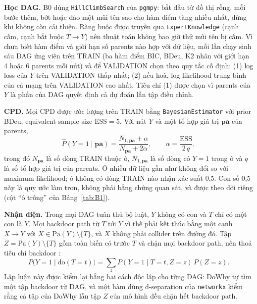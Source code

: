 \documentclass[pdflatex,sn-mathphys-num]{sn-jnl}%
\newcommand{\doop}{\mathrm{do}}                   %
\newcommand{\PaY}{\mathrm{Pa}(Y)}                 %
\begin{document}
\textbf{Học DAG.} B0 dùng \texttt{HillClimbSearch} của \texttt{pgmpy}: bắt đầu từ đồ thị rỗng, mỗi bước thêm, bớt hoặc đảo một mũi tên sao cho hàm điểm tăng nhiều nhất, dừng khi không còn cải thiện. Ràng buộc được truyền qua \texttt{ExpertKnowledge} (cạnh cấm, cạnh bắt buộc $T \to Y$) nên thuật toán không bao giờ thử mũi tên bị cấm. Vì chưa biết hàm điểm và giới hạn số parents nào hợp với dữ liệu, mỗi lần chạy sinh sáu DAG ứng viên trên TRAIN (ba hàm điểm BIC, BDeu, K2 nhân với giới hạn 4 hoặc 6 parents mỗi nút) và để VALIDATION chọn theo quy tắc cố định: (1) log loss của $Y$ trên VALIDATION thấp nhất; (2) nếu hoà, log-likelihood trung bình của cả mạng trên VALIDATION cao nhất. Tiêu chí (1) được chọn vì parents của $Y$ là phần của DAG quyết định cả dự đoán lẫn tập điều chỉnh.

\textbf{CPD.} Mọi CPD được ước lượng trên TRAIN bằng \texttt{BayesianEstimator} với prior BDeu, equivalent sample size $\mathrm{ESS}=5$. Với nút $Y$ và một tổ hợp giá trị $\mathbf{pa}$ của parents,
\begin{equation}\label{eq:bdeu}
\hat{P}(Y{=}1 \mid \mathbf{pa}) = \frac{N_{1,\mathbf{pa}} + \alpha}{N_{\mathbf{pa}} + 2\alpha}, \qquad \alpha = \frac{\mathrm{ESS}}{2\,q},
\end{equation}
trong đó $N_{\mathbf{pa}}$ là số dòng TRAIN thuộc ô, $N_{1,\mathbf{pa}}$ là số dòng có $Y=1$ trong ô và $q$ là số tổ hợp giá trị của parents. Ô nhiều dữ liệu gần như không đổi so với maximum likelihood; ô không có dòng TRAIN nào nhận xác suất 0,5. Con số 0,5 này là quy ước làm trơn, không phải bằng chứng quan sát, và được theo dõi riêng (cột ``ô trống'' của Bảng~\ref{tab:B1}).

\textbf{Nhận diện.} Trong mọi DAG tuân thủ bộ luật, $Y$ không có con và $T$ chỉ có một con là $Y$. Mọi backdoor path từ $T$ tới $Y$ vì thế phải kết thúc bằng một cạnh $X \to Y$ với $X \in \PaY \setminus \{T\}$, và $X$ không phải collider trên đường đó. Tập $Z = \PaY \setminus \{T\}$ gồm toàn biến có trước $T$ và chặn mọi backdoor path, nên thoả tiêu chí backdoor \cite{pearl2009}:
\begin{equation}\label{eq:backdoor}
P\big(Y{=}1 \mid \doop(T{=}t)\big) = \sum_{z} P(Y{=}1 \mid T{=}t, Z{=}z)\,P(Z{=}z).
\end{equation}
Lập luận này được kiểm lại bằng hai cách độc lập cho từng DAG: DoWhy \cite{dowhy2020} tự tìm một tập backdoor từ DAG, và một hàm dùng d-separation của \texttt{networkx} kiểm rằng cả tập của DoWhy lẫn tập $Z$ của mô hình đều chặn hết backdoor path.
\end{document}
